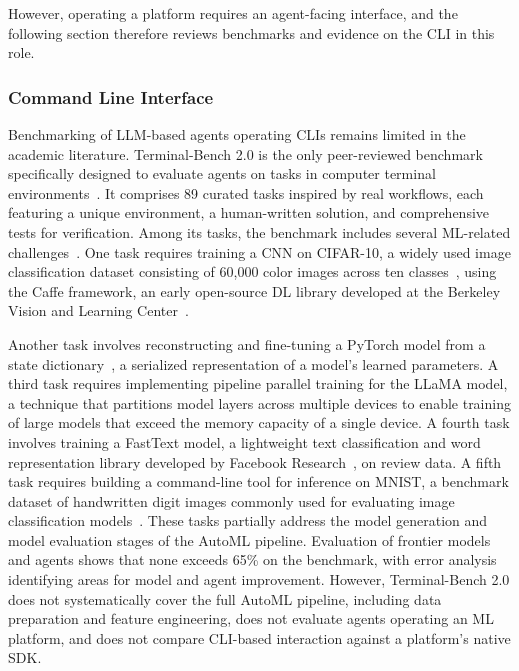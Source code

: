 \documentclass[
english,                 %
bibtex,                  %
]{kththesis}
\numberwithin{listing}{chapter}
\begin{document}
However, operating a platform requires an agent-facing interface, and the following section therefore reviews benchmarks and evidence on the \gls{CLI} in this role.

\subsubsection{Command Line Interface}
\label{sec:rw_cli}

Benchmarking of \gls{LLM}-based agents operating \glspl{CLI} remains limited in the academic literature. Terminal-Bench 2.0 is the only peer-reviewed benchmark specifically designed to evaluate agents on tasks in computer terminal environments~\cite{merrill_terminal-bench_2026}. It comprises 89 curated tasks inspired by real workflows, each featuring a unique environment, a human-written solution, and comprehensive tests for verification. Among its tasks, the benchmark includes several \gls{ML}-related challenges~\cite{stanford_university_terminal-bench_2026}. One task requires training a \gls{CNN} on \gls{CIFAR}-10, a widely used image classification dataset consisting of 60,000 color images across ten classes~\cite{krizhevsky_learning_2009}, using the Caffe framework, an early open-source \gls{DL} library developed at the Berkeley Vision and Learning Center~\cite{jia_caffe_2014}.

Another task involves reconstructing and fine-tuning a PyTorch model from a state dictionary~\cite{paszke_pytorch_2019}, a serialized representation of a model's learned parameters. A third task requires implementing pipeline parallel training for the \gls{LLaMA} model, a technique that partitions model layers across multiple devices to enable training of large models that exceed the memory capacity of a single device. A fourth task involves training a FastText model, a lightweight text classification and word representation library developed by Facebook Research~\cite{joulin_fasttextzip_2016}, on review data. A fifth task requires building a command-line tool for inference on \gls{MNIST}, a benchmark dataset of handwritten digit images commonly used for evaluating image classification models~\cite{lecun_mnist_2010}. These tasks partially address the model generation and model evaluation stages of the \gls{AutoML} pipeline. Evaluation of frontier models and agents shows that none exceeds 65\% on the benchmark, with error analysis identifying areas for model and agent improvement. However, Terminal-Bench 2.0 does not systematically cover the full \gls{AutoML} pipeline, including data preparation and feature engineering, does not evaluate agents operating an \gls{ML} platform, and does not compare \gls{CLI}-based interaction against a platform's native \gls{SDK}.
\end{document}
